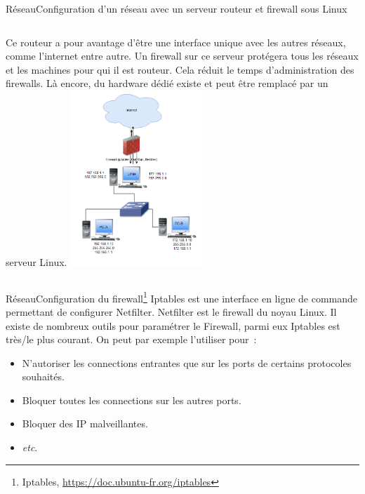 \documentclass{beamer}
\begin{document}
    \begin{frame}{Réseau}{Configuration d'un réseau avec un serveur routeur et firewall sous Linux}
        \begin{columns}
            Ce routeur a pour avantage d'être une interface unique avec les autres réseaux, comme l'internet entre autre.
            \bigbreak
            Un firewall sur ce serveur protégera tous les réseaux et les machines pour qui il est routeur.
            \bigbreak
            Cela réduit le temps d'administration des firewalls.
            \bigbreak
            Là encore, du hardware dédié existe et peut être remplacé par un serveur Linux.
            \centering
            \includegraphics[width=5cm]{image/router-and-firewall.drawio}
        \end{columns}
    \end{frame}

    \begin{frame}{Réseau}{Configuration du firewall\footnote{\label{iptables}Iptables, \url{https://doc.ubuntu-fr.org/iptables}}}
        Iptables est une interface en ligne de commande permettant de configurer Netfilter.
        Netfilter est le firewall du noyau Linux.
        \bigbreak
        Il existe de nombreux outils pour paramétrer le Firewall, parmi eux Iptables est très/le plus courant.
        \bigbreak
        On peut par exemple l'utiliser pour~:
        \begin{itemize}
            \item N'autoriser les connections entrantes que sur les ports de certains protocoles souhaités.
            \item Bloquer toutes les connections sur les autres ports.
            \item Bloquer des IP malveillantes.
            \item \textit{etc}.
        \end{itemize}
    \end{frame}
\end{document}
